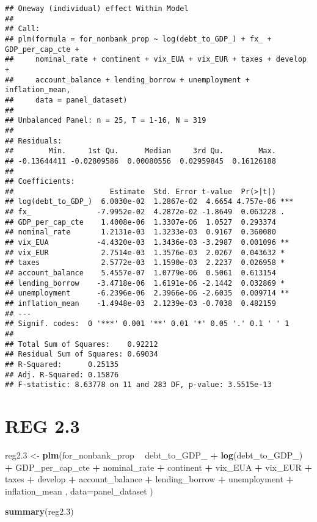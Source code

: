 \documentclass[]{article}
\newenvironment{Shaded}{\begin{snugshade}}{\end{snugshade}}
\newcommand{\KeywordTok}[1]{\textcolor[rgb]{0.13,0.29,0.53}{\textbf{#1}}}
\newcommand{\DataTypeTok}[1]{\textcolor[rgb]{0.13,0.29,0.53}{#1}}
\newcommand{\DecValTok}[1]{\textcolor[rgb]{0.00,0.00,0.81}{#1}}
\newcommand{\StringTok}[1]{\textcolor[rgb]{0.31,0.60,0.02}{#1}}
\newcommand{\OperatorTok}[1]{\textcolor[rgb]{0.81,0.36,0.00}{\textbf{#1}}}
\newcommand{\NormalTok}[1]{#1}
\begin{document}
\begin{verbatim}
## Oneway (individual) effect Within Model
## 
## Call:
## plm(formula = for_nonbank_prop ~ log(debt_to_GDP_) + fx_ + GDP_per_cap_cte + 
##     nominal_rate + continent + vix_EUA + vix_EUR + taxes + develop + 
##     account_balance + lending_borrow + unemployment + inflation_mean, 
##     data = panel_dataset)
## 
## Unbalanced Panel: n = 25, T = 1-16, N = 319
## 
## Residuals:
##        Min.     1st Qu.      Median     3rd Qu.        Max. 
## -0.13644411 -0.02809586  0.00080556  0.02959845  0.16126188 
## 
## Coefficients:
##                      Estimate  Std. Error t-value  Pr(>|t|)    
## log(debt_to_GDP_)  6.0030e-02  1.2867e-02  4.6654 4.757e-06 ***
## fx_               -7.9952e-02  4.2872e-02 -1.8649  0.063228 .  
## GDP_per_cap_cte    1.4008e-06  1.3307e-06  1.0527  0.293374    
## nominal_rate       1.2131e-03  1.3233e-03  0.9167  0.360080    
## vix_EUA           -4.4320e-03  1.3436e-03 -3.2987  0.001096 ** 
## vix_EUR            2.7514e-03  1.3576e-03  2.0267  0.043632 *  
## taxes              2.5772e-03  1.1590e-03  2.2237  0.026958 *  
## account_balance    5.4557e-07  1.0779e-06  0.5061  0.613154    
## lending_borrow    -3.4718e-06  1.6191e-06 -2.1442  0.032869 *  
## unemployment      -6.2396e-06  2.3966e-06 -2.6035  0.009714 ** 
## inflation_mean    -1.4948e-03  2.1239e-03 -0.7038  0.482159    
## ---
## Signif. codes:  0 '***' 0.001 '**' 0.01 '*' 0.05 '.' 0.1 ' ' 1
## 
## Total Sum of Squares:    0.92212
## Residual Sum of Squares: 0.69034
## R-Squared:      0.25135
## Adj. R-Squared: 0.15876
## F-statistic: 8.63778 on 11 and 283 DF, p-value: 3.5515e-13
\end{verbatim}

\section{REG 2.3}\label{reg-2.3}

\begin{Shaded}
\begin{Highlighting}[]
\NormalTok{reg2.}\DecValTok{3}\NormalTok{ <-}\StringTok{ }\KeywordTok{plm}\NormalTok{(for_nonbank_prop }\OperatorTok{~}\StringTok{  }\NormalTok{debt_to_GDP_ }\OperatorTok{+}\StringTok{ }\KeywordTok{log}\NormalTok{(debt_to_GDP_) }\OperatorTok{+}\StringTok{  }\NormalTok{GDP_per_cap_cte }\OperatorTok{+}\StringTok{  }\NormalTok{nominal_rate }\OperatorTok{+}\StringTok{ }\NormalTok{continent }\OperatorTok{+}\StringTok{ }\NormalTok{vix_EUA }\OperatorTok{+}\StringTok{ }\NormalTok{vix_EUR }\OperatorTok{+}\StringTok{ }\NormalTok{taxes }\OperatorTok{+}\StringTok{ }\NormalTok{develop }\OperatorTok{+}\StringTok{ }\NormalTok{account_balance }\OperatorTok{+}\StringTok{ }\NormalTok{lending_borrow }\OperatorTok{+}\StringTok{ }\NormalTok{unemployment }\OperatorTok{+}\StringTok{ }\NormalTok{inflation_mean , }\DataTypeTok{data=}\NormalTok{panel_dataset  )}

\KeywordTok{summary}\NormalTok{(reg2.}\DecValTok{3}\NormalTok{)}
\end{Highlighting}
\end{Shaded}
\end{document}

